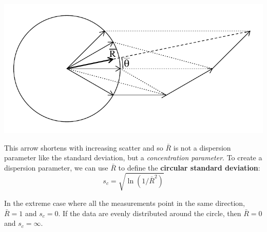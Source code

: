 \noindent\begin{minipage}[t][][b]{.45\textwidth}
\includegraphics[width=\textwidth]{../figures/vectorsum.pdf}\medskip
\end{minipage}
\begin{minipage}[t][][t]{.55\textwidth}
  \label{fig:vectorsum}
\end{minipage}

This arrow shortens with increasing scatter and so $\bar{R}$ is not a
dispersion parameter like the standard deviation, but a
\textit{concentration parameter}. To create a dispersion parameter, we
can use $\bar{R}$ to define the \textbf{circular standard deviation}:
\begin{equation}
  s_c = \sqrt{\ln(1/\bar{R}^2)}
  \label{eq:circularSD}
\end{equation}

In the extreme case where all the measurements point in the same
direction, $\bar{R} = 1$ and $s_c = 0$. If the data are evenly
distributed around the circle, then $\bar{R} = 0$ and $s_c = \infty$.

